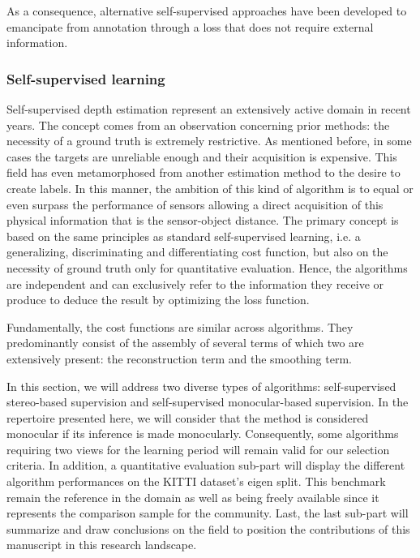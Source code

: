 As a consequence, alternative self-supervised approaches have been developed to emancipate from annotation through a loss that does not require external information.

\subsubsection{Self-supervised learning}\label{usl}

Self-supervised depth estimation represent an extensively active domain in recent years. The concept comes from an observation concerning prior methods: the necessity of a ground truth is extremely restrictive. As mentioned before, in some cases the targets are unreliable enough and their acquisition is expensive.
This field has even metamorphosed from another estimation method to the desire to create labels. In this manner, the ambition of this kind of algorithm is to equal or even surpass the performance of sensors allowing a direct acquisition of this physical information that is the sensor-object distance.
The primary concept is based on the same principles as standard self-supervised learning, i.e. a generalizing, discriminating and differentiating cost function, but also on the necessity of ground truth only for quantitative evaluation. Hence, the algorithms are independent and can exclusively refer to the information they receive or produce to deduce the result by optimizing the loss function.

Fundamentally, the cost functions are similar across algorithms. They predominantly consist of the assembly of several terms of which two are extensively present: the reconstruction term and the smoothing term.

In this section, we will address two diverse types of algorithms: self-supervised stereo-based supervision and self-supervised monocular-based supervision. In the repertoire presented here, we will consider that the method is considered monocular if its inference is made monocularly. Consequently, some algorithms requiring two views for the learning period will remain valid for our selection criteria. 
In addition, a quantitative evaluation sub-part will display the different algorithm performances on the KITTI dataset's eigen split. This benchmark remain the reference in the domain as well as being freely available since it represents the comparison sample for the community.
Last, the last sub-part will summarize and draw conclusions on the field to position the contributions of this manuscript in this research landscape.

